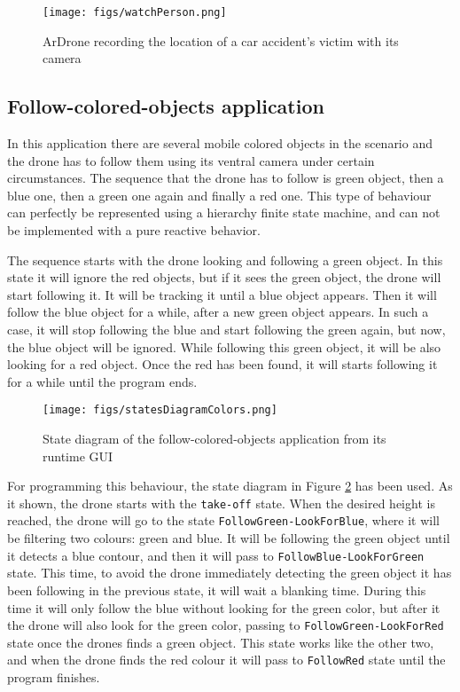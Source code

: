 \documentclass[journal,twoside]{JoPhA}
\begin{document}
\begin{figure}[ht!]
\begin{center}
        \texttt{[image: figs/watchPerson.png]}
\end{center}
\caption{ArDrone recording the location of a car accident's victim with its camera}
\label{fig:watchPerson} 
\end{figure}

\subsection{Follow-colored-objects application}
In this application there are several mobile colored objects in the scenario and the drone has to follow them using its ventral camera under certain circumstances. The sequence that the drone has to follow is green object, then a blue one, then a green one again and finally a red one. This type of behaviour can perfectly be represented using a hierarchy finite state machine, and can not be implemented with a pure reactive behavior.

The sequence starts with the drone looking and following a green object. In this state it will ignore the red objects, but if it sees the green object, the drone will start following it. It will be tracking it until a blue object appears. Then it will follow the blue object for a while, after a new green object appears. In such a case, it will stop following the blue and start following the green again, but now, the blue object will be ignored. While following this green object, it will be also looking for a red object. Once the red has been found, it will starts following it for a while until the program ends. 

\begin{figure}[ht!]
\begin{center}
        \texttt{[image: figs/statesDiagramColors.png]}
\end{center}
\caption{State diagram of the follow-colored-objects application from its runtime GUI}
\label{fig:statesColors}
\end{figure}

For programming this behaviour, the state diagram in Figure \ref{fig:statesColors} has been used. As it shown, the drone starts with the \texttt{take-off} state. When the desired height is reached, the drone will go to the state \texttt{FollowGreen-LookForBlue}, where it will be filtering two colours: green and blue. It will be following the green object until it detects a blue contour, and then it will pass to \texttt{FollowBlue-LookForGreen} state. This time, to avoid the drone immediately detecting the green object it has been following in the previous state, it will wait a blanking time. During this time it will only follow the blue without looking for the green color, but after it the drone will also look for the green color, passing to \texttt{FollowGreen-LookForRed} state once the drones finds a green object. This state works like the other two, and when the drone finds the red colour it will pass to \texttt{FollowRed} state until the program finishes. 
\end{document}
